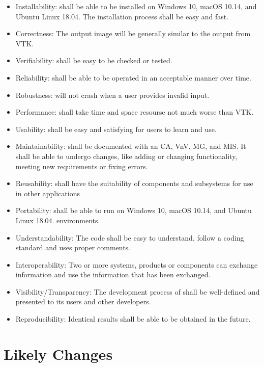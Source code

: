 \documentclass[12pt]{article}
\begin{document}
\begin{itemize}
\item Installability: \famname{} shall be able to be installed on Windows 10, macOS 10.14, and Ubuntu Linux 18.04. The installation process shall be easy and fast.
\item Correctness: The output image will be generally similar to the output from VTK.
\item Verifiability: \famname{} shall be easy to be checked or tested.
\item Reliability: \famname{} shall be able to be operated in an acceptable manner over time.
\item Robustness: \famname{} will not crash when a user provides invalid input.
\item Performance: \famname{} shall take time and space resourse not much worse than VTK.
\item Usability: \famname{} shall be easy and satisfying for users to learn and use.
\item Maintainability: \famname{} shall be documented with an CA, VnV, MG, and MIS. It shall be able to undergo changes, like adding or changing functionality, meeting new requirements or fixing errors.
\item Reusability: \famname{} shall have the suitability of components and subsystems for use in other applications
\item Portability: \famname{} shall be able to run on Windows 10, macOS 10.14, and Ubuntu Linux 18.04.
environments.
\item Understandability: The code shall be easy to understand, follow a coding standard and uses proper comments.
\item Interoperability: Two or more systems, products or components can exchange information and use the information that has been exchanged.
\item Visibility/Transparency: The development process of \famname{} shall be well-defined and presented to its users and other developers.
\item Reproducibility: Identical results shall be able to be obtained in the future.
\end{itemize}

\section{Likely Changes}    
\end{document}
